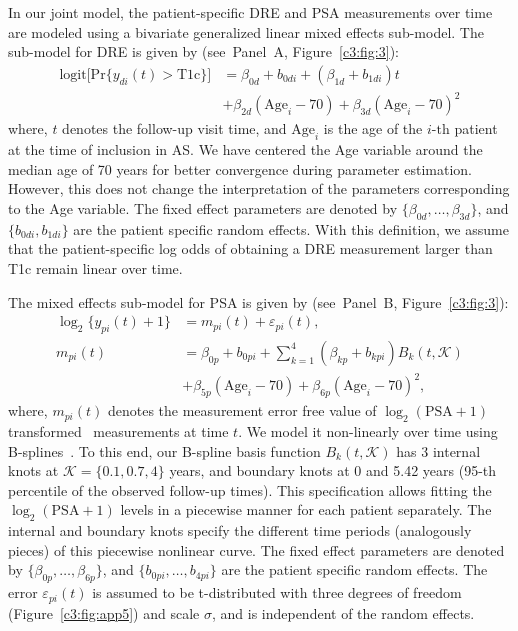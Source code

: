 In our joint model, the patient-specific DRE and PSA measurements over time are modeled using a bivariate generalized linear mixed effects sub-model. The sub-model for DRE is given by (see~Panel~A, Figure~\ref{c3:fig:3}):
\begin{equation}
\label{c3:eq:long_model_dre}
\begin{split}
    \mbox{logit} \big[\mbox{Pr}\{y_{di}(t) > \mbox{T1c}\}\big] &= \beta_{0d} + b_{0di} + (\beta_{1d} + b_{1di}) t\\
    &+ \beta_{2d} (\mbox{Age}_i-70)  + \beta_{3d} (\mbox{Age}_i-70)^2
    \end{split}
\end{equation}
where, $t$ denotes the follow-up visit time, and $\mbox{Age}_i$ is the age of the ${i\mbox{-th}}$ patient at the time of inclusion in AS. We have centered the Age variable around the median age of 70 years for better convergence during parameter estimation. However, this does not change the interpretation of the parameters corresponding to the Age variable. The fixed effect parameters are denoted by ${\{\beta_{0d}, \ldots, \beta_{3d}\}}$, and ${\{b_{0di}, b_{1di}\}}$ are the patient specific random effects. With this definition, we assume that the patient-specific log odds of obtaining a DRE measurement larger than T1c remain linear over time. 

The mixed effects sub-model for PSA is given by (see~Panel~B, Figure~\ref{c3:fig:3}):
\begin{equation}
\label{c3:eq:long_model_psa}
\begin{split}
    \log_2 \big\{y_{pi}(t) + 1\big\} &= m_{pi}(t) + \varepsilon_{pi}(t),\\
    m_{pi}(t) &= \beta_{0p} + b_{0pi} + \sum_{k=1}^4 (\beta_{kp} + b_{kpi})  B_k(t,\mathcal{K})\\ 
    &+ \beta_{5p} (\mbox{Age}_i-70) + \beta_{6p} (\mbox{Age}_i-70)^2,
    \end{split}
\end{equation}
where, $m_{pi}(t)$ denotes the %
measurement error free value of $\log_2 (\mbox{PSA} + 1)$ transformed~\citep{pearson1994mixed,lin2000latent} measurements at time $t$. We model it non-linearly over time using B-splines~\citep{de1978practical}. To this end, our B-spline basis function $B_k(t, \mathcal{K})$ has 3 internal knots at $\mathcal{K} = \{0.1, 0.7, 4\}$ years, and boundary knots at 0 and 5.42 years (95-th percentile of the observed follow-up times). This specification allows fitting the $\log_2 (\mbox{PSA} + 1)$ levels in a piecewise manner for each patient separately. The internal and boundary knots specify the different time periods (analogously pieces) of this piecewise nonlinear curve. The fixed effect parameters are denoted by ${\{\beta_{0p},\ldots,\beta_{6p}\}}$, and ${\{b_{0pi}, \ldots, b_{4pi}\}}$ are the patient specific random effects. The error $\varepsilon_{pi}(t)$ is assumed to be t-distributed with three degrees of freedom (Figure~\ref{c3:fig:app5}) and scale $\sigma$, and is independent of the random effects. 

